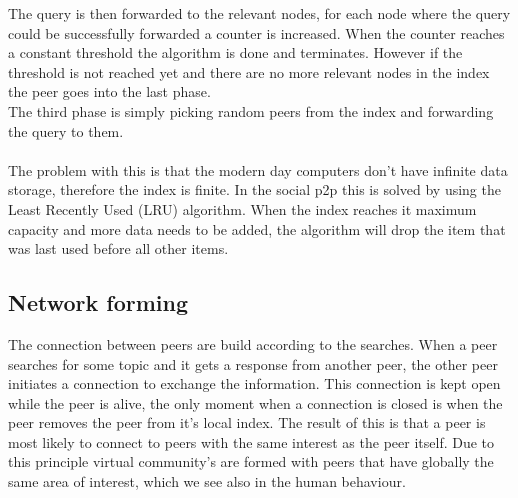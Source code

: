 		The query is then forwarded to the relevant nodes, for each node where the query could be successfully forwarded a counter is increased.
		When the counter reaches a constant threshold the algorithm is done and terminates.
		However if the threshold is not reached yet and there are no more relevant nodes in the index the peer goes into the last phase.\\
		The third phase is simply picking random peers from the index and forwarding the query to them.\\
		\\
		The problem with this is that the modern day computers don't have infinite data storage, therefore the index is finite.
		In the social p2p this is solved by using the Least Recently Used (LRU) algorithm.
		When the index reaches it maximum capacity and more data needs to be added, the algorithm will drop the item that was last used before all other items.\\
		
	\subsection{Network forming}
		The connection between peers are build according to the searches.
		When a peer searches for some topic and it gets a response from another peer, the other peer initiates a connection to exchange the information.
		This connection is kept open while the peer is alive, the only moment when a connection is closed is when the peer removes the peer from it's local index.
		The result of this is that a peer is most likely to connect to peers with the same interest as the peer itself.
		Due to this principle virtual community's are formed with peers that have globally the same area of interest, which we see also in the human behaviour.